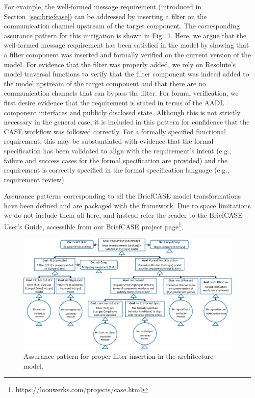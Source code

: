 For example, the well-formed message requirement (introduced in Section~\ref{sec:briefcase}) can be addressed by inserting a filter on the communication channel upstream of the target component.  The corresponding assurance pattern for this mitigation is shown in Fig.~\ref{fig:filter}.  
Here, we argue that the well-formed message requirement has been satisfied in the model by showing that a filter component was inserted and formally verified on the current version of the model.  
%
For evidence that the filter was properly added, we rely on Resolute's model traversal functions to verify that the filter component was indeed added to the model upstream of the target component and that there are no communication channels that can bypass the filter.
%
For formal verification, we first desire evidence that the requirement is stated in terms of the AADL component interfaces and publicly disclosed state. Although this is not strictly necessary in the general case, it is included in this pattern for confidence that the CASE workflow was followed correctly.  For a formally specified functional requirement, this may be substantiated with evidence that the formal specification has been validated to align with the requirement's intent (e.g., failure and success cases for the formal specification are provided)
and the requirement is correctly specified in the formal specification language (e.g., requirement review).

Assurance patterns corresponding to all the BriefCASE model transformations have been defined and are packaged with the framework.  Due to space limitations we do not include them all here, and instead refer the reader to the BriefCASE User's Guide, accessible from our BriefCASE project page\footnote{https://loonwerks.com/projects/case.html}.%


\begin{figure}[h] 
	\centering 
	\includegraphics[width=\textwidth]{figs/filter.png}
	\caption{Assurance pattern for proper filter insertion in the architecture model.}
	\label{fig:filter} 
\end{figure}

